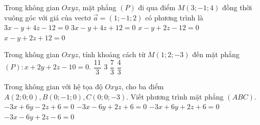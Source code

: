 \begin{ex}%
	Trong không gian $Oxyz$, mặt phẳng $(P)$ đi qua điểm $M(3;-1; 4)$ đồng thời vuông góc với giá của vectơ $\vec{a}=(1;-1; 2)$ có phương trình là
	\choice
	{$3x-y+4z-12=0$}
	{$3x-y+4z+12=0$}
	{\True $x-y+2z-12=0$}
	{$x-y+2z+12=0$}
\end{ex}
\begin{ex}%
	Trong không gian $Oxyz$, tính khoảng cách từ $M(1; 2;-3)$ đến mặt phẳng $(P)\colon x+2y+2z-10=0$.
	\choice
	{\True $\dfrac{11}{3}$}
	{$3$}
	{$\dfrac{7}{3}$}
	{$\dfrac{4}{3}$}
\end{ex}
\begin{ex}%
	Trong không gian với hệ tọa độ $Oxyz$, cho ba điểm $A(2; 0; 0), B(0;-1; 0), C(0; 0;-3)$. Viết phương trình mặt phẳng $(ABC)$.
	\choice
	{$-3x+6y-2z+6=0$}
	{$-3x-6y+2z+6=0$}
	{\True $-3x+6y+2z+6=0$}
	{$-3x-6y+2z-6=0$}
\end{ex}

